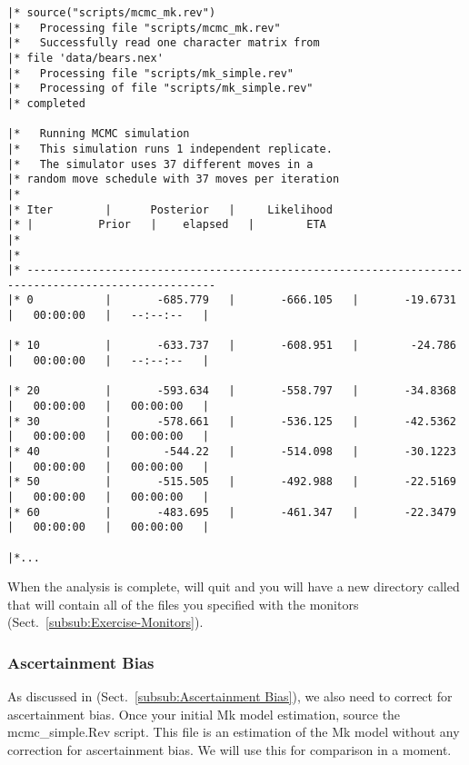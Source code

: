 {\tiny{\tt \begin{snugshade*}
\begin{lstlisting}
|* source("scripts/mcmc_mk.rev")
|*   Processing file "scripts/mcmc_mk.rev"
|*   Successfully read one character matrix from
|* file 'data/bears.nex'
|*   Processing file "scripts/mk_simple.rev"
|*   Processing of file "scripts/mk_simple.rev"
|* completed

|*   Running MCMC simulation
|*   This simulation runs 1 independent replicate.
|*   The simulator uses 37 different moves in a
|* random move schedule with 37 moves per iteration
|*
|* Iter        |      Posterior   |     Likelihood  
|* |          Prior   |    elapsed   |        ETA   
|*
|*
|* ---------------------------------------------------------------------------------------------------
|* 0           |       -685.779   |       -666.105   |       -19.6731   |   00:00:00   |   --:--:--   |

|* 10          |       -633.737   |       -608.951   |        -24.786   |   00:00:00   |   --:--:--   |

|* 20          |       -593.634   |       -558.797   |       -34.8368   |   00:00:00   |   00:00:00   |
|* 30          |       -578.661   |       -536.125   |       -42.5362   |   00:00:00   |   00:00:00   |
|* 40          |        -544.22   |       -514.098   |       -30.1223   |   00:00:00   |   00:00:00   |
|* 50          |       -515.505   |       -492.988   |       -22.5169   |   00:00:00   |   00:00:00   |
|* 60          |       -483.695   |       -461.347   |       -22.3479   |   00:00:00   |   00:00:00   |

|*...
\end{lstlisting}
\end{snugshade*}}}

When the analysis is complete, \RevBayes will quit and you will have a new directory called  that will contain all of the files you specified with the monitors (Sect.\ \ref{subsub:Exercise-Monitors}).

\subsubsection{Ascertainment Bias}

As discussed in (Sect.\ \ref{subsub:Ascertainment Bias}), we also need to correct for ascertainment bias. 
Once your initial Mk model estimation, source the mcmc\_simple.Rev script. 
This file is an estimation of the Mk model without any correction for ascertainment bias. 
We will use this for comparison in a moment. \par


 

\newpage
